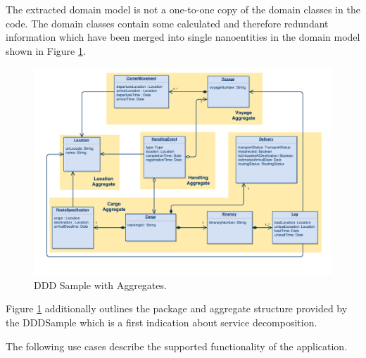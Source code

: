 The extracted domain model is not a one-to-one copy of the domain classes in the code. The domain classes contain some calculated and therefore redundant information which have been merged into single nanoentities in the domain model shown in Figure \ref{fig:dddSampleAggregates}. 

\begin{figure}[H]
	\includegraphics[scale=0.5]{diagrams/ddd_sample_aggregates.pdf}
	\caption{DDD Sample with Aggregates.}
	\label{fig:dddSampleAggregates}
\end{figure}

Figure \ref{fig:dddSampleAggregates} additionally outlines the package and aggregate structure provided by the DDDSample which is a first indication about service decomposition. 

The following use cases describe the supported functionality of the application.

